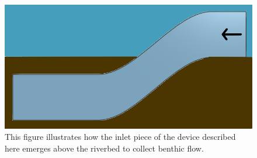 \documentclass[fleqn,10pt]{SelfArx} %
\begin{document}
	\begin{figure}[h]
		\centering
		\includegraphics[width=1\linewidth]{Figures/InletInSitu}
		\caption[Inlet 2D Model]{This figure illustrates how the inlet piece of the device described here emerges above the riverbed to collect benthic flow.}
		\label{fig:InletInSitu}
	\end{figure}
	
\end{document}
